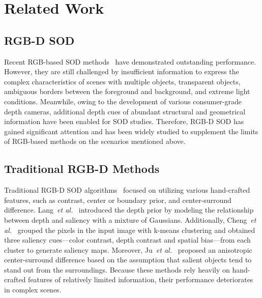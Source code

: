 \documentclass[runningheads]{llncs}
\begin{document}
	\section{Related Work}
	\label{sec:related}
	\subsection{RGB-D SOD}
	Recent RGB-based SOD methods~\cite{zhao2015saliency,wang2019salient,zhao2019egnet,park2021saliency,fan2018salient} have demonstrated outstanding performance. However, they are still challenged by insufficient information to express the complex characteristics of scenes with multiple objects, transparent objects, ambiguous borders between the foreground and background, and extreme light conditions. Meanwhile, owing to the development of various consumer-grade depth cameras, additional depth cues of abundant structural and geometrical information have been enabled for SOD studies. Therefore, RGB-D SOD has gained significant attention and has been widely studied to supplement the limits of RGB-based methods on the scenarios mentioned above. 
	
	\subsection{Traditional RGB-D Methods}
	Traditional RGB-D SOD algorithms~\cite{desingh2013depth,cong2016saliency,cheng2014depth,cong2019going,ju2014depth,guo2016salient,lang2012depth} focused on utilizing various hand-crafted features, such as contrast, center or boundary prior, and center-surround difference. 
	Lang~{\textit{et al.}}~\cite{lang2012depth} introduced the depth prior by modeling the relationship between depth and saliency with a mixture of Gaussians. 
	Additionally, Cheng~{\textit{et al.}}~\cite{cheng2014depth} grouped the pixels in the input image with k-means clustering and obtained three saliency cues—color contrast, depth contrast and spatial bias—from each cluster to generate saliency maps.
	Moreover, Ju~{\textit{et al.}}~\cite{ju2014depth} proposed an anisotropic center-surround difference based on the assumption that salient objects tend to stand out from the surroundings. 
	Because these methods rely heavily on hand-crafted features of relatively limited information, their performance deteriorates in complex scenes.
	
\end{document}
